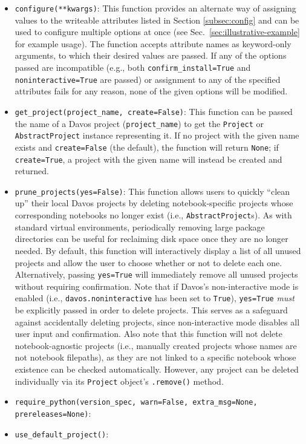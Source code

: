 \documentclass[preprint,12pt,a4paper]{elsarticle}
\begin{document}
\begin{itemize}

\item \texttt{configure(**kwargs)}: This function provides an alternate way of assigning values to the writeable attributes listed in Section \ref{subsec:config} and can be used to configure multiple options at once (see Sec.~\ref{sec:illustrative-example} for example usage). The function accepts attribute names as keyword-only arguments, to which their desired values are passed. If any of the options passed are incompatible (e.g., both \texttt{confirm\_install=True} and \texttt{noninteractive=True} are passed) or assignment to any of the specified attributes fails for any reason, none of the given options will be modified.

\item \texttt{get\_project(project\_name, create=False)}: This function can be passed the name of a Davos project (\texttt{project\_name}) to get the \texttt{Project} or \texttt{AbstractProject} instance representing it. If no project with the given name exists and \texttt{create=False} (the default), the function will return \texttt{None}; if \texttt{create=True}, a project with the given name will instead be created and returned.

\item \texttt{prune\_projects(yes=False)}: This function allows users to quickly ``clean up'' their local Davos projects by deleting notebook-specific projects whose corresponding notebooks no longer exist (i.e., \texttt{AbstractProject}s). As with standard virtual environments, periodically removing large package directories can be useful for reclaiming disk space once they are no longer needed. By default, this function will interactively display a list of all unused projects and allow the user to choose whether or not to delete each one. Alternatively, passing \texttt{yes=True} will immediately remove all unused projects without requiring confirmation. Note that if Davos's non-interactive mode is enabled (i.e., \texttt{davos.noninteractive} has been set to \texttt{True}), \texttt{yes=True} \textit{must} be explicitly passed in order to delete projects. This serves as a safeguard against accidentally deleting projects, since non-interactive mode disables all user input and confirmation.  Also note that this function will not delete notebook-agnostic projects (i.e., manually created projects whose names are not notebook filepaths), as they are not linked to a specific notebook whose existence can be checked automatically. However, any project can be deleted individually via its \texttt{Project} object's \texttt{.remove()} method.

\item \texttt{require\_python(version\_spec, warn=False, extra\_msg=None, prereleases=None)}:
\item \texttt{use\_default\_project()}:
\end{itemize}
\end{document}
